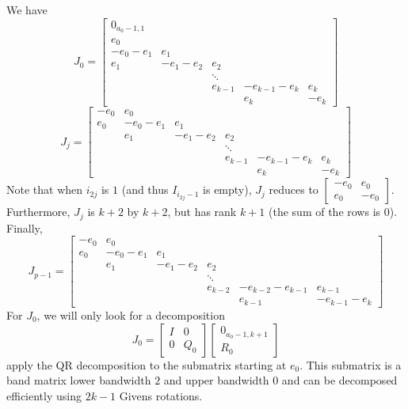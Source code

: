 \documentclass[]{article}
\newcommand{\BIN}{\begin{bmatrix}}
\newcommand{\BOUT}{\end{bmatrix}}
\begin{document}
We have 
\begin{equation*}
  J_0 = \BIN
    0_{a_0-1,1} &          &         &                &      \\
    e_0         &          &         &                &      \\
   -e_0-e_1     &  e_1     &         &                &      \\
    e_1         & -e_1-e_2 & e_2     &                &      \\
                &          & \ddots  &                &      \\
                &          & e_{k-1} & -e_{k-1} - e_k &  e_k \\
                &          &         &     e_k        & -e_k
  \BOUT
\end{equation*}
\begin{equation*}
  J_j = \BIN
   -e_0     &  e_0     &          &          &                &      \\
    e_0     & -e_0-e_1 & e_1      &          &                &      \\
            & e_1      & -e_1-e_2 & e_2      &                &      \\
            &          &          & \ddots   &                &      \\
            &          &          & e_{k-1}  & -e_{k-1} - e_k &  e_k \\
            &          &          &          &     e_k        & -e_k
  \BOUT
\end{equation*}
Note that when $i_{2j}$ is $1$ (and thus $I_{i_{2j}-1}$ is empty), $J_j$ reduces to $\BIN -e_0 & e_0 \\ e_0 & -e_0\BOUT$. Furthermore, $J_j$ is $k+2$ by $k+2$, but has rank $k+1$ (the sum of the rows is $0$). Finally,
\begin{equation*}
  J_{p-1} = \BIN
   -e_0     &  e_0     &          &          &                    &              \\
    e_0     & -e_0-e_1 & e_1      &          &                    &              \\
            & e_1      & -e_1-e_2 & e_2      &                    &              \\
            &          &          & \ddots   &                    &              \\
            &          &          & e_{k-2}  & -e_{k-2} - e_{k-1} & e_{k-1}      \\
            &          &          &          &     e_{k-1}        & -e_{k-1}-e_k 
  \BOUT
\end{equation*}
For $J_0$, we will only look for a decomposition
\begin{equation*}
  J_0 = \BIN I & 0 \\ 0 & Q_0 \BOUT \BIN 0_{a_0-1,k+1} \\ R_0 \BOUT
\end{equation*}
apply the QR decomposition to the submatrix starting at $e_0$. This submatrix is a band matrix lower bandwidth $2$ and upper bandwidth $0$ and can be decomposed efficiently using $2k-1$ Givens rotations.
\end{document}

